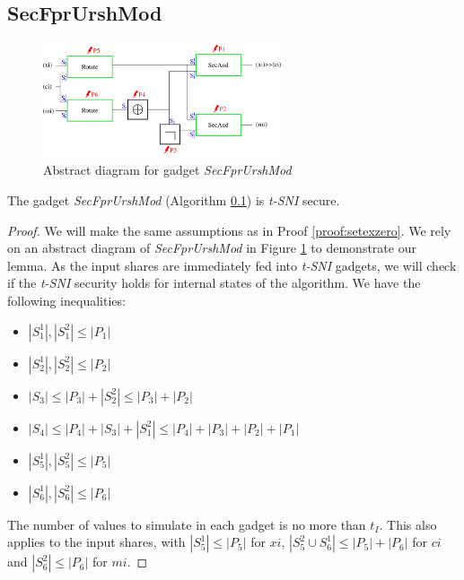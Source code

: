 \documentclass[runningheads]{llncs}
\begin{document}
\subsection{SecFprUrshMod}
\label{alg:secfprurshmod}
\begin{figure}[!ht]
    \centering
    \includegraphics[width = 7cm]{figure/secfprurshmod.pdf}
    \caption{Abstract diagram for gadget \emph{SecFprUrshMod}}
    \label{fig:secfprurshmod}
\end{figure}
\begin{lemma}\label{lem:secfprurshmod}
    The gadget \emph{SecFprUrshMod} (Algorithm \ref{alg:secfprurshmod}) is \emph{t-SNI} secure.    
\end{lemma}
\begin{proof}
    We will make the same assumptions as in Proof \ref{proof:setexzero}. We rely on an abstract diagram of \emph{SecFprUrshMod} in Figure \ref{fig:secfprurshmod} to demonstrate our lemma. As the input shares are immediately fed into \emph{t-SNI} gadgets, we will check if the \emph{t-SNI} security holds for internal states of the algorithm. We have the following inequalities:
    \begin{multicols}{2}
        \begin{itemize}
            \item $|S_1^1|,|S_1^2|\leq|P_1|$
            \item $|S_2^1|,|S_2^2|\leq|P_2|$
            \item $|S_3|\leq|P_3| + |S_2^2| \leq |P_3| + |P_2|$
            \item $|S_4|\leq|P_4| + |S_3| + |S_1^2| \leq |P_4| + |P_3| + |P_2| + |P_1|$
            \item $|S_5^1|,|S_5^2| \leq |P_5|$
            \item $|S_6^1|,|S_6^2| \leq |P_6|$
        \end{itemize}
    \end{multicols}
    The number of values to simulate in each gadget is no more than $t_I$. This also applies to the input shares, with $|S_5^1| \leq |P_5|$ for $xi$, $|S_5^2 \cup S_6^1| \leq |P_5| + |P_6|$ for $ci$ and $|S_6^2| \leq |P_6|$ for $mi$.
\end{proof}
\end{document}
